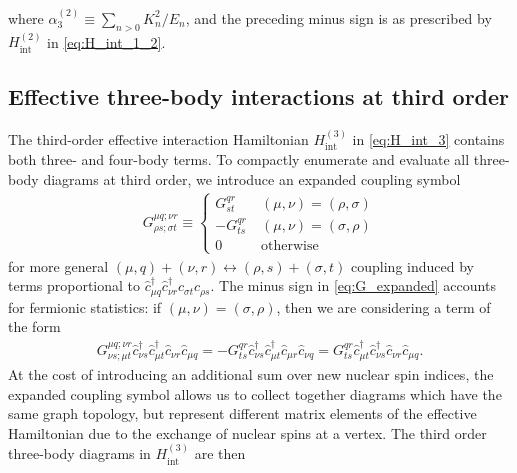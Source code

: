 \documentclass[preprint,showkeys,nofootinbib]{revtex4-1}
\renewcommand{\t}{\text} %
\newcommand{\p}[1]{\left(#1\right)} %
\renewcommand{\c}{\hat{c}}
\newcommand{\1}{\mathds{1}}
\begin{document}
where $\alpha_3^{(2)} \equiv \sum_{n>0} K_n^2/E_n$, and the preceding
minus sign is as prescribed by $H_{\t{int}}^{(2)}$ in
\eqref{eq:H_int_1_2}.


\subsection{Effective three-body interactions at third order}

The third-order effective interaction Hamiltonian $H_{\t{int}}^{(3)}$
in \eqref{eq:H_int_3} contains both three- and four-body terms.  To
compactly enumerate and evaluate all three-body diagrams at third
order, we introduce an expanded coupling symbol
\begin{align}
  G^{\mu q;\nu r}_{\rho s;\sigma t} \equiv \left\{
    \begin{array}{ll}
      G^{qr}_{st} & ~ \p{\mu,\nu} = \p{\rho,\sigma}
      \\
      - G^{qr}_{ts} & ~ \p{\mu,\nu} = \p{\sigma,\rho}
      \\
      0 & ~ \t{otherwise}
    \end{array}\right.
  \label{eq:G_expanded}
\end{align}
for more general
$\p{\mu,q}+\p{\nu,r}\leftrightarrow\p{\rho,s}+\p{\sigma,t}$ coupling
induced by terms proportional to
$\c_{\mu q}^\dag \c_{\nu r}^\dag \c_{\sigma t} \c_{\rho s}$.  The
minus sign in \eqref{eq:G_expanded} accounts for fermionic statistics:
if $\p{\mu,\nu}=\p{\sigma,\rho}$, then we are considering a term of
the form
\begin{align}
  G^{\mu q;\nu r}_{\nu s;\mu t}
  \c_{\nu s}^\dag \c_{\mu t}^\dag \c_{\nu r} \c_{\mu q}
  = -G^{qr}_{ts} \c_{\nu s}^\dag \c_{\mu t}^\dag \c_{\mu r} \c_{\nu q}
  = G^{qr}_{ts} \c_{\mu t}^\dag \c_{\nu s}^\dag \c_{\nu r} \c_{\mu q}.
\end{align}
At the cost of introducing an additional sum over new nuclear spin
indices, the expanded coupling symbol allows us to collect together
diagrams which have the same graph topology, but represent different
matrix elements of the effective Hamiltonian due to the exchange of
nuclear spins at a vertex.  The third order three-body diagrams in
$H_{\t{int}}^{(3)}$ are then
\end{document}
